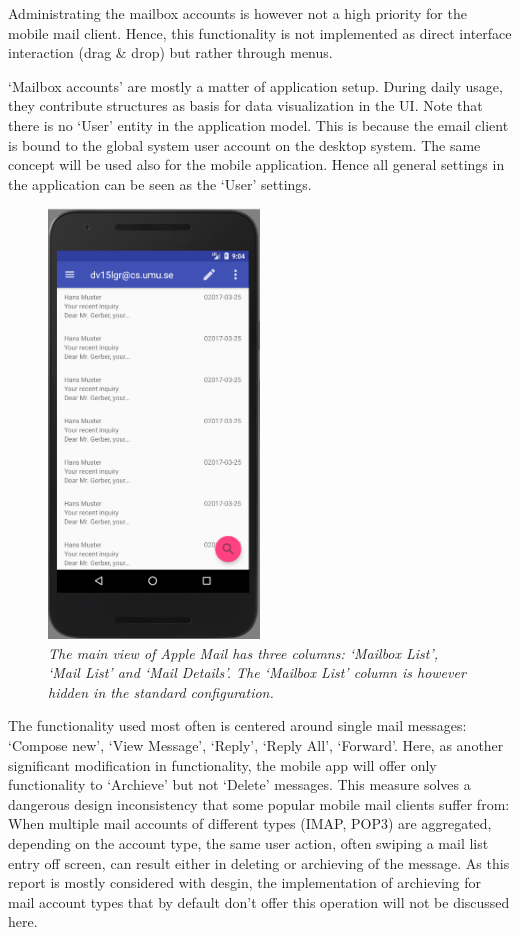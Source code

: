 \documentclass[a4paper,11pt,twoside]{article}
\begin{document}
Administrating the mailbox accounts is however not a high priority for the
mobile mail client. Hence, this functionality is not implemented as direct
interface interaction (drag \& drop) but rather through menus.

`Mailbox accounts' are mostly a matter of application setup. During daily usage,
they contribute structures as basis for data visualization in the UI. Note that
there is no `User' entity in the application model. This is because the email
client is bound to the global system user account on the desktop system. The
same concept will be used also for the mobile application. Hence all general
settings in the application can be seen as the `User' settings.

\begin{figure}
  \label{fig:mail_message_list}
  \centering
    \includegraphics[width=0.5\textwidth]{mail_message_list}
    \caption{\textit{The main view of Apple Mail has three columns: `Mailbox List',
    `Mail List' and `Mail Details'. The `Mailbox List' column is however
    hidden in the standard configuration.}}
\end{figure}

The functionality used most often is centered around single mail messages:
`Compose new', `View Message', `Reply', `Reply All', `Forward'. Here, as another
significant modification in functionality, the mobile app will offer
only functionality to `Archieve' but not `Delete' messages. This measure  solves
a dangerous design inconsistency that some popular mobile mail clients  suffer
from: When multiple mail accounts of different types (IMAP, POP3) are
aggregated, depending on the account type, the same user action,  often swiping
a mail list entry off screen, can result either in deleting or archieving of the
message. As this report is mostly considered with desgin, the  implementation of
archieving for mail account types that by default don't offer this operation will
not be discussed here.
\end{document}
